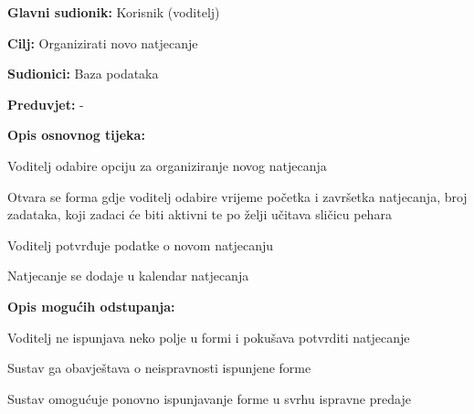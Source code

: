 					\noindent {}
					\begin{packed_item}
						
						\item \textbf{Glavni sudionik: }Korisnik (voditelj)
						\item \textbf{Cilj:} Organizirati novo natjecanje
						\item \textbf{Sudionici:} Baza podataka
						\item \textbf{Preduvjet:} -
						\item \textbf{Opis osnovnog tijeka:}
						
						\item[] \begin{packed_enum}
							\item Voditelj odabire opciju za organiziranje novog natjecanja
							\item Otvara se forma gdje voditelj odabire vrijeme početka i završetka natjecanja, broj zadataka, koji zadaci će biti aktivni te po želji učitava sličicu pehara
							\item Voditelj potvrđuje podatke o novom natjecanju
							\item Natjecanje se dodaje u kalendar natjecanja
							
						\end{packed_enum}
						
						\item  \textbf{Opis mogućih odstupanja:}
						\item[] \begin{packed_item}
							
							\item[2.a] Voditelj ne ispunjava neko polje u formi i pokušava potvrditi natjecanje
							\item[] \begin{packed_enum}
								
								\item Sustav ga obavještava o neispravnosti ispunjene forme
								\item Sustav omogućuje ponovno ispunjavanje forme u svrhu ispravne predaje
								
							\end{packed_enum}
						\end{packed_item}
					\end{packed_item}
										
